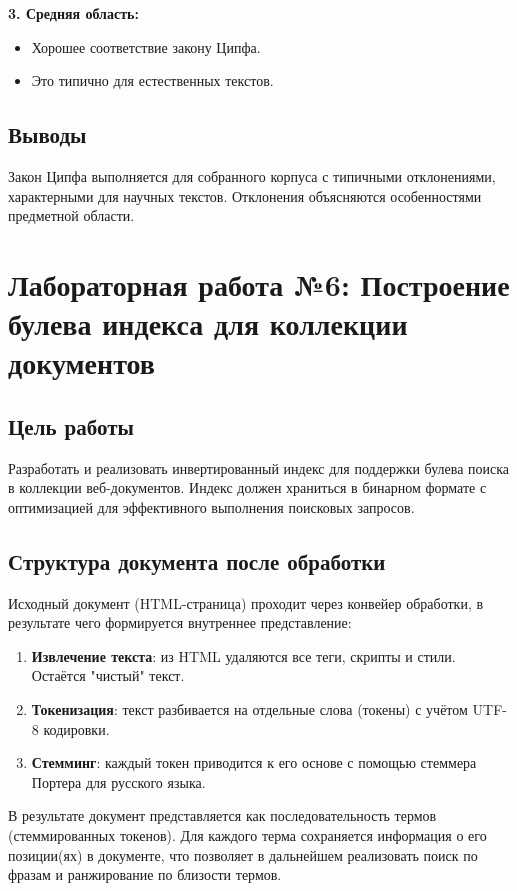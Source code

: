 \documentclass[a4paper,12pt]{article}
\begin{document}
\textbf{3. Средняя область:}
\begin{itemize}
    \item Хорошее соответствие закону Ципфа.
    \item Это типично для естественных текстов.
\end{itemize}

\subsection{Выводы}
Закон Ципфа выполняется для собранного корпуса с типичными отклонениями, характерными для научных текстов. Отклонения объясняются особенностями предметной области.

\section{Лабораторная работа №6: Построение булева индекса для коллекции документов}

\subsection{Цель работы}
Разработать и реализовать инвертированный индекс для поддержки булева поиска в коллекции веб-документов. Индекс должен храниться в бинарном формате с оптимизацией для эффективного выполнения поисковых запросов.

\subsection{Структура документа после обработки}
Исходный документ (HTML-страница) проходит через конвейер обработки, в результате чего формируется внутреннее представление:

\begin{enumerate}
    \item \textbf{Извлечение текста}: из HTML удаляются все теги, скрипты и стили. Остаётся "чистый" текст.
    \item \textbf{Токенизация}: текст разбивается на отдельные слова (токены) с учётом UTF-8 кодировки.
    \item \textbf{Стемминг}: каждый токен приводится к его основе с помощью стеммера Портера для русского языка.
\end{enumerate}

В результате документ представляется как последовательность термов (стеммированных токенов). Для каждого терма сохраняется информация о его позиции(ях) в документе, что позволяет в дальнейшем реализовать поиск по фразам и ранжирование по близости термов.
\end{document}
